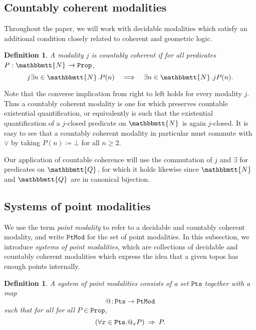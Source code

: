 \documentclass[reqno,11pt]{amsproc}
\makeatletter
\theoremstyle{plain}
\newtheorem{definition}[theorem]{Definition}
\theoremstyle{definition}
\newcommand{\Const}[1]{\mathtt{#1}}
\renewcommand{\to}[1][]{\xrightarrow{#1}}
\newcommand{\internal}[1]{\raisebox{-.03ex}{$\mathbbmtt{#1}$}}
\newcommand{\hs}{\hspace{1pt}}
\newcommand{\tnn}{\internal{N}\hs}
\newcommand{\tqq}{\internal{Q}\hs}
\newcommand{\prop}{\Const{Prop}}
\newcommand{\pt}{x}
\newcommand{\pts}{\mathtt{Pts}}		%
\newcommand{\ptmod}{\mathtt{PtMod}}	%
\newcommand{\atsymbol}{{@}}
\newcommand{\at}[1][\pt]{\atsymbol_{#1}}
\let\originalleft\left
\let\originalright\right
\renewcommand{\left}{\mathopen{}\mathclose\bgroup\originalleft}
\renewcommand{\right}{\aftergroup\egroup\originalright}
\newcommand{\beq}{\begin{equation}}
\newcommand{\eeq}{\end{equation}}
\numberwithin{equation}{section}
\makeatother
\begin{document}
\subsection{Countably coherent modalities}

Throughout the paper, we will work with decidable modalities which satisfy an additional condition closely related to coherent and geometric logic.

\begin{definition}
	\label{countably_coherent}
	A modality $j$ is \emph{countably coherent} if for all predicates $P : \tnn \to \prop$,
	\[
		j \exists n \in \tnn . P(n) \quad \Longrightarrow \quad \exists n \in \tnn . jP(n).
	\]
\end{definition}

Note that the converse implication from right to left holds for every modality $j$. Thus a countably coherent modality is one for which preserves countable existential quantification, or equivalently is such that the existential quantification of a $j$-closed predicate on $\tnn$ is again $j$-closed. It is easy to see that a countably coherent modality in particular must commute with $\lor$ by taking $P(n) \coloneqq \bot$ for all $n \ge 2$.

Our application of countable coherence will use the commutation of $j$ and $\exists$ for predicates on $\tqq$, for which it holds likewise since $\tnn$ and $\tqq$ are in canonical bijection.

\subsection{Systems of point modalities}
\label{axioms_soundness}

We use the term \emph{point modality} to refer to a decidable and countably coherent modality, and write $\ptmod$ for the set of point modalities. 
In this subsection, we introduce \emph{systems of point modalities}, which are collections of decidable and countably coherent modalities which express the idea that a given topos has enough points internally.

\begin{definition}
	A \emph{system of point modalities} consists of a set $\pts$ together with a map
	\[
		\at[] \colon \pts \to \ptmod		
	\]
	such that for all for all $P \in \prop$,
	\beq
		\label{enough_pts}
		\left( \forall \pt \in \pts . \at P \right) \: \Rightarrow \: P.
	\eeq
\end{definition}
\end{document}
